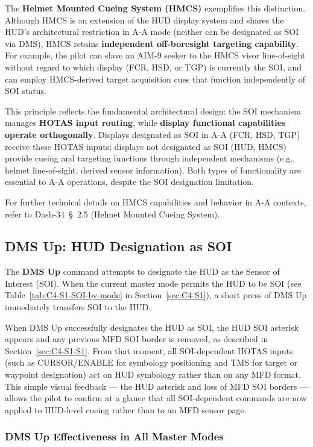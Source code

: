 \documentclass[11pt,a4paper]{article}
\providecommand{\dashref}[1]{Dash-34~\S~#1}
\begin{document}
The \textbf{Helmet Mounted Cueing System (HMCS)} exemplifies this distinction. Although HMCS is an extension of the HUD display system and shares the HUD's architectural restriction in A-A mode (neither can be designated as SOI via DMS), HMCS retains \textbf{independent off-boresight targeting capability}. For example, the pilot can slave an AIM-9 seeker to the HMCS visor line-of-sight without regard to which display (FCR, HSD, or TGP) is currently the SOI, and can employ HMCS-derived target acquisition cues that function independently of SOI status.

This principle reflects the fundamental architectural design: the SOI mechanism manages \textbf{HOTAS input routing}, while \textbf{display functional capabilities operate orthogonally}. Displays designated as SOI in A-A (FCR, HSD, TGP) receive these HOTAS inputs; displays not designated as SOI (HUD, HMCS) provide cueing and targeting functions through independent mechanisms (e.g., helmet line-of-sight, derived sensor information). Both types of functionality are essential to A-A operations, despite the SOI designation limitation.

For further technical details on HMCS capabilities and behavior in A-A contexts, refer to \dashref{2.5} (Helmet Mounted Cueing System).

\subsection{DMS Up: HUD Designation as SOI}
\label{sec:C4-S2}

The \textbf{DMS Up} command attempts to designate the HUD as the Sensor of Interest (SOI). When the current master mode permits the HUD to be SOI (see Table~\ref{tab:C4-S1-SOI-by-mode} in Section~\ref{sec:C4-S1}), a short press of DMS Up immediately transfers SOI to the HUD.

When DMS Up successfully designates the HUD as SOI, the HUD SOI asterisk appears and any previous MFD SOI border is removed, as described in Section~\ref{sec:C4-S1-S1}. From that moment, all SOI-dependent HOTAS inputs (such as CURSOR/ENABLE for symbology positioning and TMS for target or waypoint designation) act on HUD symbology rather than on any MFD format. This simple visual feedback --- the HUD asterisk and loss of MFD SOI borders --- allows the pilot to confirm at a glance that all SOI-dependent commands are now applied to HUD-level cueing rather than to an MFD sensor page.

\subsubsection{DMS Up Effectiveness in All Master Modes}
\label{sec:C4-S2-S1}
\end{document}
